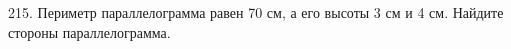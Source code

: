 215. Периметр параллелограмма равен 70 см, а его высоты 3 см и 4 см. Найдите стороны параллелограмма.\\
